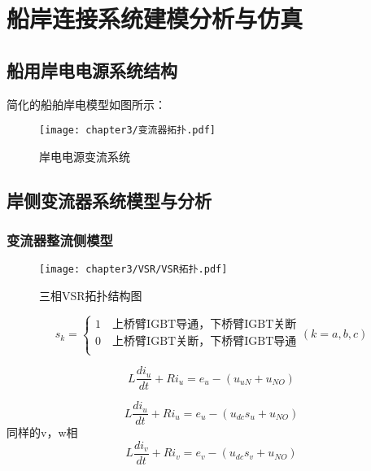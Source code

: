 \chapter{船岸连接系统建模分析与仿真}

\section{船用岸电电源系统结构}

简化的船舶岸电模型如图所示：

\begin{figure}[!htp]
	\centering
	\texttt{[image: chapter3/变流器拓扑.pdf]}
	\caption{岸电电源变流系统}
	\label{fig:岸电电源变流系统}
\end{figure}

\section{岸侧变流器系统模型与分析}

\subsection{变流器整流侧模型}

\begin{figure}[!htp]
	\centering
	\texttt{[image: chapter3/VSR/VSR拓扑.pdf]}
	\caption{三相VSR拓扑结构图}
	\label{fig:三相VSR拓扑结构图}
\end{figure}

\begin{equation}
	s_{k} =
	\begin{cases}
		1 \quad \text{上桥臂IGBT导通，下桥臂IGBT关断} \\
		0 \quad \text{上桥臂IGBT关断，下桥臂IGBT导通} \\
	\end{cases}
	(k=a,b,c)
	\label{equ:Sk}
\end{equation}

\begin{equation}
	L\frac{di_{u}}{dt}+Ri_{u}=e_{u}-(u_{uN}+u_{NO})
	\label{equ:3-3}
\end{equation}

\begin{equation}
	L\frac{di_{u}}{dt}+Ri_{u}=e_{u}-(u_{dc}s_{u}+u_{NO})
\end{equation}
同样的v，w相
\begin{equation}
	L\frac{di_{v}}{dt}+Ri_{v}=e_{v}-(u_{dc}s_{v}+u_{NO})
	\label{equ:3-4}
\end{equation}

